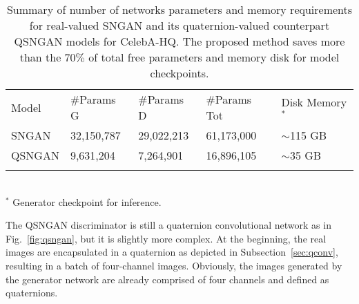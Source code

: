 \documentclass[graybox]{svmult}
\begin{document}
\begin{table}[t]
\centering
\caption{Summary of number of networks parameters and memory requirements for real-valued SNGAN and its quaternion-valued counterpart QSNGAN models for CelebA-HQ. The proposed method saves more than the $70\%$ of total free parameters and memory disk for model checkpoints.}
\begin{tabular}{p{2cm}p{2.4cm}p{2.4cm}p{2.4cm}p{1.8cm}}
\hline\noalign{\smallskip}
 Model    & \#Params G & \#Params D & \#Params Tot & Disk Memory$^*$ \\
\noalign{\smallskip}\svhline\noalign{\smallskip}
 SNGAN  & 32,150,787    & 29,022,213    & 61,173,000      &  $\sim$115 GB \\
 QSNGAN & 9,631,204     & 7,264,901     & 16,896,105      &  $\sim$35 GB  \\
\noalign{\smallskip}\hline\noalign{\smallskip}

\end{tabular}\\
\label{tab:params}
$^*$ Generator checkpoint for inference.
\end{table}

The QSNGAN discriminator is still a quaternion convolutional network as in Fig.~\ref{fig:qsngan}, but it is slightly more complex. At the beginning, the real images are encapsulated in a quaternion as depicted in Subsection~\ref{sec:qconv}, resulting in a batch of four-channel images. Obviously, the images generated by the generator network are already comprised of four channels and defined as quaternions.
\end{document}

